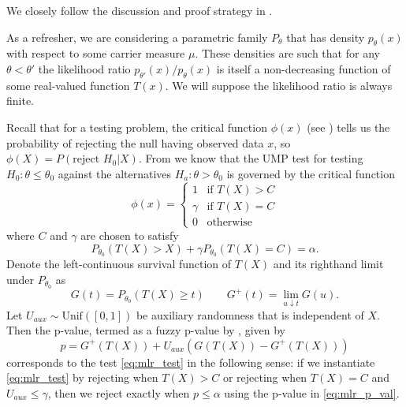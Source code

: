 \documentclass{article}
\begin{document}
\begin{appendix}
We closely follow the discussion and proof strategy in \cite[Appendix B.1]{Lei}.

As a refresher, we are considering a parametric family $P_{\theta}$ that has density $p_{\theta}(x)$ with respect to some carrier measure $\mu$. These densities are such that for any $\theta < \theta'$ the likelihood ratio $p_{\theta'}(x)/p_{\theta}(x)$ is itself a non-decreasing function of some real-valued function $T(x)$. We will suppose the likelihood ratio is always finite. 


Recall that for a testing problem, the critical function $\phi(x)$ (see \cite[Section 3.1]{Lehmann}) tells us the probability of rejecting the null having observed data $x$, so $\phi(X) = P(\text{reject } H_0 | X)$. From \cite[Theorem 3.4.1]{Lehmann} we know that the UMP test for testing $H_0 : \theta \leq \theta_0$ against the alternatives $H_a : \theta > \theta_0 $ is governed by the critical function 
\begin{equation}
    \label{eq:mlr_test}
    \phi(x) = \begin{cases}
        1 &\text{if } T(X) > C  \\
        \gamma &\text{if } T(X) = C  \\
        0 & \text{otherwise }
    \end{cases}
\end{equation}
where $C$ and $\gamma$ are chosen to satisfy
\begin{equation*}
    P_{\theta_0}(T(X) > X) + \gamma P_{\theta_0}(T(X) = C) = \alpha.
\end{equation*}
Denote the left-continuous survival function of $T(X)$ and its righthand limit under $P_{\theta_0}$ as
\begin{equation*}
    G(t) = P_{\theta_0}(T(X) \geq t) \qquad G^+(t) = \lim_{u \downarrow t} G(u).
\end{equation*}
Let $U_{aux} \sim \text{Unif}([0, 1])$ be auxiliary randomness that is independent of $X$. Then the p-value, termed as a fuzzy p-value by \cite{Geyer}, given by
\begin{equation}
    \label{eq:mlr_p_val}
    p = G^+(T(X)) + U_{aux}(G(T(X)) - G^+(T(X)))
\end{equation}
corresponds to the test \eqref{eq:mlr_test} in the following sense: if we instantiate \eqref{eq:mlr_test} by rejecting when $T(X) > C$ or rejecting when $T(X) = C$ and $U_{aux} \leq \gamma$, then we reject exactly when $p \leq \alpha$ using the p-value in \eqref{eq:mlr_p_val}. 


\end{appendix}
\end{document}

